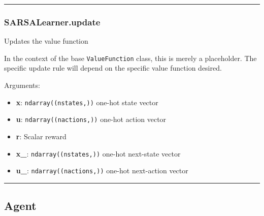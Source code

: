 \begin{center}\rule{0.5\linewidth}{\linethickness}\end{center}

\hypertarget{sarsalearner.update}{%
\subsubsection{SARSALearner.update}\label{sarsalearner.update}}

\begin{Shaded}
\begin{Highlighting}[]
\end{Highlighting}
\end{Shaded}

Updates the value function

In the context of the base \texttt{ValueFunction} class, this is merely
a placeholder. The specific update rule will depend on the specific
value function desired.

Arguments:

\begin{itemize}
\tightlist
\item
  \textbf{x}: \texttt{ndarray((nstates,))} one-hot state vector
\item
  \textbf{u}: \texttt{ndarray((nactions,))} one-hot action vector
\item
  \textbf{r}: Scalar reward
\item
  \textbf{x\_}: \texttt{ndarray((nstates,))} one-hot next-state vector
\item
  \textbf{u\_}: \texttt{ndarray((nactions,))} one-hot next-action vector
\end{itemize}

\begin{center}\rule{0.5\linewidth}{\linethickness}\end{center}

\hypertarget{agent}{%
\subsection{Agent}\label{agent}}

\begin{Shaded}
\begin{Highlighting}[]
\end{Highlighting}
\end{Shaded}

